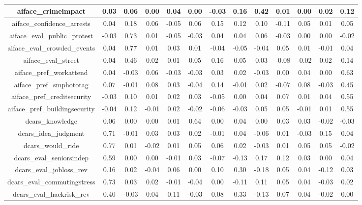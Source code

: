 {\begin{tabular}{c | c | c | c | c | c | c | c | c | c | c | c | c}
  \hline
  aiface\_crimeimpact & 0.03 & 0.06 & 0.00 & 0.04 & 0.00 & -0.03 & 0.16 & 0.42 & 0.01 & 0.00 & 0.02 & 0.12 \\
  \hline
  aiface\_confidence\_arrests & 0.04 & 0.18 & 0.06 & -0.05 & 0.06 & 0.15 & 0.12 & 0.10 & -0.11 & 0.05 & 0.01 & 0.05 \\
  \hline
  aiface\_eval\_public\_protest & -0.03 & 0.73 & 0.01 & -0.05 & -0.03 & 0.04 & 0.04 & 0.06 & -0.03 & 0.00 & 0.00 & -0.02 \\
  \hline
  aiface\_eval\_crowded\_events & 0.04 & 0.77 & 0.01 & 0.03 & 0.01 & -0.04 & -0.05 & -0.04 & 0.05 & 0.01 & -0.01 & 0.04 \\
  \hline
  aiface\_eval\_street & 0.04 & 0.46 & 0.02 & 0.01 & 0.05 & 0.16 & 0.05 & 0.03 & -0.08 & -0.02 & 0.02 & 0.14 \\
  \hline
  aiface\_pref\_workattend & 0.04 & -0.03 & 0.06 & -0.03 & -0.03 & 0.03 & 0.02 & -0.03 & 0.00 & 0.04 & 0.00 & 0.63 \\
  \hline
  aiface\_pref\_smphototag & 0.07 & -0.01 & 0.08 & 0.03 & -0.04 & 0.14 & -0.01 & 0.02 & -0.07 & 0.08 & -0.03 & 0.45 \\
  \hline
  aiface\_pref\_creditsecurity & -0.03 & 0.10 & 0.01 & 0.02 & 0.03 & -0.05 & 0.00 & 0.04 & 0.07 & 0.01 & 0.04 & 0.55 \\
  \hline
  aiface\_pref\_buildingsecurity & -0.04 & 0.12 & -0.01 & 0.02 & -0.02 & -0.06 & -0.03 & 0.05 & 0.05 & -0.01 & 0.01 & 0.55 \\
  \hline
  dcars\_knowledge & 0.06 & 0.00 & 0.00 & 0.01 & 0.64 & 0.00 & 0.04 & 0.00 & 0.03 & 0.03 & -0.02 & -0.03 \\
  \hline
  dcars\_idea\_judgment & 0.71 & -0.01 & 0.03 & 0.03 & 0.02 & -0.01 & 0.04 & -0.06 & 0.01 & -0.03 & 0.15 & 0.04 \\
  \hline
  dcars\_would\_ride & 0.77 & 0.01 & -0.02 & 0.01 & 0.05 & 0.06 & 0.02 & -0.03 & 0.01 & 0.05 & 0.05 & -0.02 \\
  \hline
  dcars\_eval\_seniorsindep & 0.59 & 0.00 & 0.00 & -0.01 & 0.03 & -0.07 & -0.13 & 0.17 & 0.12 & 0.03 & 0.00 & 0.04 \\
  \hline
  dcars\_eval\_jobloss\_rev & 0.16 & 0.02 & -0.04 & 0.06 & 0.00 & 0.10 & 0.30 & -0.18 & 0.05 & 0.04 & -0.12 & 0.03 \\
  \hline
  dcars\_eval\_commutingstress & 0.73 & 0.03 & 0.02 & -0.01 & -0.04 & 0.00 & -0.11 & 0.11 & 0.05 & 0.04 & -0.03 & 0.02 \\
  \hline
  dcars\_eval\_hackrisk\_rev & 0.40 & -0.03 & 0.04 & 0.11 & -0.03 & 0.08 & 0.33 & -0.13 & 0.07 & 0.04 & -0.02 & 0.00 \\

\end{tabular}}
